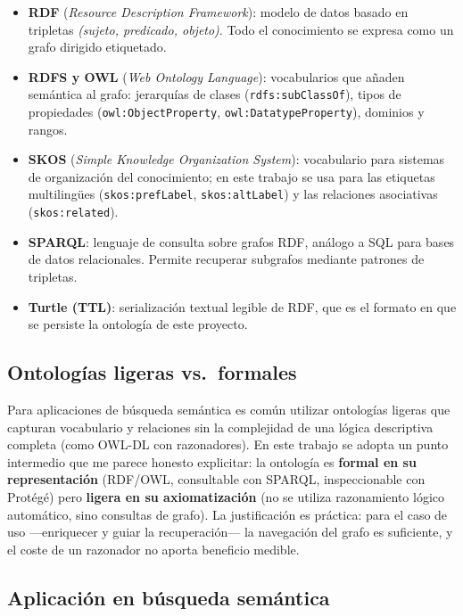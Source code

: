 \documentclass[12pt, a4paper, twoside]{report}
\begin{document}
\begin{itemize}
  \item \textbf{RDF} (\textit{Resource Description Framework}): modelo de datos basado en tripletas \textit{(sujeto, predicado, objeto)}. Todo el conocimiento se expresa como un grafo dirigido etiquetado.
  \item \textbf{RDFS y OWL} (\textit{Web Ontology Language}): vocabularios que a\~naden sem\'antica al grafo: jerarqu\'ias de clases (\texttt{rdfs:subClassOf}), tipos de propiedades (\texttt{owl:ObjectProperty}, \texttt{owl:DatatypeProperty}), dominios y rangos.
  \item \textbf{SKOS} (\textit{Simple Knowledge Organization System}): vocabulario para sistemas de organizaci\'on del conocimiento; en este trabajo se usa para las etiquetas multiling\"ues (\texttt{skos:prefLabel}, \texttt{skos:altLabel}) y las relaciones asociativas (\texttt{skos:related}).
  \item \textbf{SPARQL}: lenguaje de consulta sobre grafos RDF, an\'alogo a SQL para bases de datos relacionales. Permite recuperar subgrafos mediante patrones de tripletas.
  \item \textbf{Turtle (TTL)}: serializaci\'on textual legible de RDF, que es el formato en que se persiste la ontolog\'ia de este proyecto.
\end{itemize}

\subsection{Ontolog\'ias ligeras vs.\ formales}

Para aplicaciones de b\'usqueda sem\'antica es com\'un utilizar ontolog\'ias ligeras que capturan vocabulario y relaciones sin la complejidad de una l\'ogica descriptiva completa (como OWL-DL con razonadores). En este trabajo se adopta un punto intermedio que me parece honesto explicitar: la ontolog\'ia es \textbf{formal en su representaci\'on} (RDF/OWL, consultable con SPARQL, inspeccionable con Prot\'eg\'e) pero \textbf{ligera en su axiomatizaci\'on} (no se utiliza razonamiento l\'ogico autom\'atico, sino consultas de grafo). La justificaci\'on es pr\'actica: para el caso de uso ---enriquecer y guiar la recuperaci\'on--- la navegaci\'on del grafo es suficiente, y el coste de un razonador no aporta beneficio medible.

\subsection{Aplicaci\'on en b\'usqueda sem\'antica}
\end{document}
